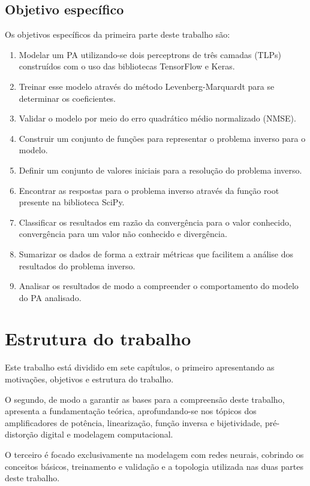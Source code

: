 \subsection{Objetivo específico} \label{ssec:introd-obje-espec}
Os objetivos específicos da primeira parte deste trabalho são:

\begin{enumerate}
    \item Modelar um PA utilizando-se dois perceptrons de três camadas (TLPs) construídos com o uso das bibliotecas TensorFlow e Keras.
    \item Treinar esse modelo através do método Levenberg-Marquardt para se determinar os coeficientes.
    \item Validar o modelo por meio do erro quadrático médio normalizado (NMSE).
    \item Construir um conjunto de funções para representar o problema inverso para o modelo.
    \item Definir um conjunto de valores iniciais para a resolução do problema inverso.
    \item Encontrar as respostas para o problema inverso através da função root presente na biblioteca SciPy.
    \item Classificar os resultados em razão da convergência para o valor conhecido, convergência para um valor não conhecido e divergência.
    \item Sumarizar os dados de forma a extrair métricas que facilitem a análise dos resultados do problema inverso.
    \item Analisar os resultados de modo a compreender o comportamento do modelo do PA analisado.
\end{enumerate}

\section{Estrutura do trabalho} \label{sec:introd-estrut}
Este trabalho está dividido em sete capítulos, o primeiro apresentando as motivações, objetivos e estrutura do trabalho.

O segundo, de modo a garantir as bases para a compreensão deste trabalho, apresenta a fundamentação teórica, aprofundando-se nos tópicos dos amplificadores de potência, linearização, função inversa e bijetividade, pré-distorção digital e modelagem computacional.

O terceiro é focado exclusivamente na modelagem com redes neurais, cobrindo os conceitos básicos, treinamento e validação e a topologia utilizada nas duas partes deste trabalho.

